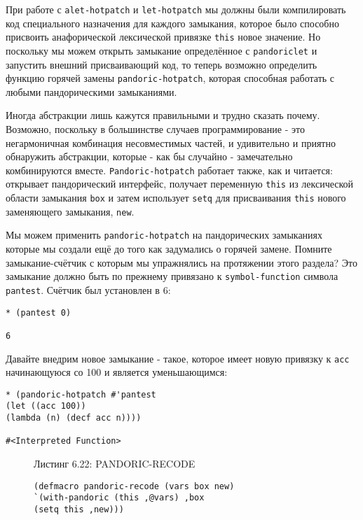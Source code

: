 При работе с \verb"alet-hotpatch" и \verb"let-hotpatch" мы должны были компилировать код специального назначения для каждого замыкания, которое было способно присвоить анафорической лексической привязке \verb"this" новое значение. Но поскольку мы можем открыть замыкание определённое с \verb"pandoriclet" и запустить внешний присваивающий код, то теперь возможно определить функцию горячей замены \verb"pandoric-hotpatch", которая способная работать с любыми пандорическими замыканиями.

Иногда абстракции лишь кажутся правильными и трудно сказать почему. Возможно, поскольку в большинстве случаев программирование - это негармоничная комбинация несовместимых частей, и удивительно и приятно обнаружить абстракции, которые - как бы случайно - замечательно комбинируются вместе. \verb"Pandoric-hotpatch" работает также, как и читается: открывает пандорический интерфейс, получает переменную \verb"this" из лексической области замыкания \verb"box" и затем использует \verb"setq" для присваивания \verb"this" нового заменяющего замыкания, \verb"new".

Мы можем применить \verb"pandoric-hotpatch" на пандорических замыканиях которые мы создали ещё до того как задумались о горячей замене. Помните замыкание-счётчик с которым мы упражнялись на протяжении этого раздела? Это замыкание должно быть по прежнему привязано к \verb"symbol-function" символа \verb"pantest". Счётчик был установлен в 6:

\begin{verbatim}
* (pantest 0)

6
\end{verbatim}

Давайте внедрим новое замыкание - такое, которое имеет новую привязку к \verb"acc" начинающуюся со 100 и является уменьшающимся:

\begin{verbatim}
* (pandoric-hotpatch #'pantest
(let ((acc 100))
(lambda (n) (decf acc n))))

#<Interpreted Function>
\end{verbatim}

\begin{figure}Листинг 6.22: PANDORIC-RECODE\label{listing_6.22}
\listbegin
\begin{verbatim}
(defmacro pandoric-recode (vars box new)
`(with-pandoric (this ,@vars) ,box
(setq this ,new)))
\end{verbatim}
\listend
\end{figure}

